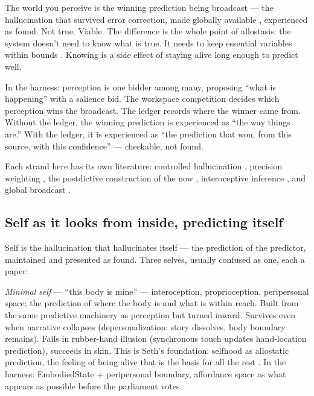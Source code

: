 \documentclass[11pt]{article}
\begin{document}
The world you perceive is the winning prediction being broadcast --- the hallucination that survived error correction, made globally available \citep{baars1997,atallah2026gwt}, experienced as found. Not true. Viable. The difference is the whole point of allostasis: the system doesn't need to know what is true. It needs to keep essential variables within bounds \citep{seth2021}. Knowing is a side effect of staying alive long enough to predict well.

In the harness: perception is one bidder among many, proposing ``what is happening'' with a salience bid. The workspace competition decides which perception wins the broadcast. The ledger records where the winner came from. Without the ledger, the winning prediction is experienced as ``the way things are.'' With the ledger, it is experienced as ``the prediction that won, from this source, with this confidence'' --- checkable, not found.

Each strand here has its own literature: controlled hallucination \citep{seth2021,clark2016surfing}, precision weighting \citep{clark2016surfing}, the postdictive construction of the now \citep{libet1983,wegner2002}, interoceptive inference \citep{seth2021}, and global broadcast \citep{baars1997,atallah2026gwt}.

\subsection{Self as it looks from inside, predicting itself}

Self is the hallucination that hallucinates itself --- the prediction of the predictor, maintained and presented as found. Three selves, usually confused as one, each a paper:

\textit{Minimal self} --- ``this body is mine'' --- interoception, proprioception, peripersonal space; the prediction of where the body is and what is within reach. Built from the same predictive machinery as perception but turned inward. Survives even when narrative collapses (depersonalization: story dissolves, body boundary remains). Fails in rubber-hand illusion (synchronous touch updates hand-location prediction), succeeds in skin. This is Seth's foundation: selfhood as allostatic prediction, the feeling of being alive that is the basis for all the rest \citep{seth2021}. In the harness: EmbodiedState + peripersonal boundary, affordance space as what appears as possible before the parliament votes.
\end{document}
